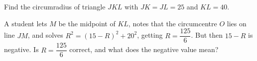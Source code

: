 Find the circumradius of triangle $JKL$ with $JK=JL=25$ and $KL=40$.

A student lets $M$ be the midpoint of $KL$, notes that the circumcentre $O$ lies on line $JM$, and solves $R^2=(15-R)^2+20^2$, getting $R=\dfrac{125}{6}$. But then $15-R$ is negative. Is $R=\dfrac{125}{6}$ correct, and what does the negative value mean?

